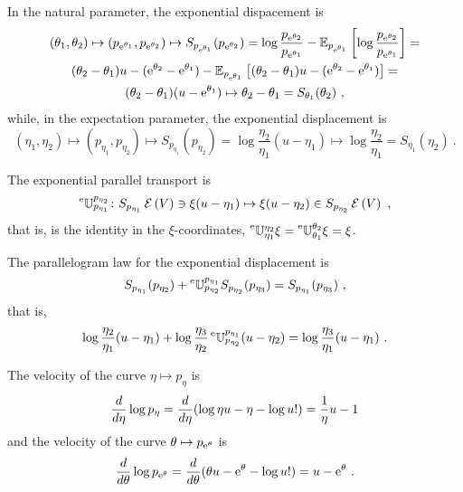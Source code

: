 \documentclass[12pt,a4paper]{amsart}
\begin{document}
In the natural parameter, the exponential dispacement is
\begin{multline}
  \label{eq:6}
  (\theta_1,\theta_2) \mapsto \left(p_{\mathrm{e}^{\theta_1}},p_{\mathrm{e}^{\theta_2}}\right) \mapsto S_{p_{\mathrm{e}^{\theta_1}}}(p_{\mathrm{e}^{\theta_2}}) = \log \frac {p_{\mathrm{e}^{\theta_2}}}{p_{\mathrm{e}^{\theta_1}}} - \operatorname{\mathbb E}_{p_{\mathrm{e}^{\theta_1}}}\left[\log \frac {p_{\mathrm{e}^{\theta_2}}}{p_{\mathrm{e}^{\theta_1}}}\right] = \\ (\theta_2 - \theta_1) u - (\mathrm{e}^{\theta_2} - \mathrm{e}^{\theta_1}) - \operatorname{\mathbb E}_{p_{\mathrm{e}^{\theta_1}}}\left[(\theta_2 - \theta_1) u - (\mathrm{e}^{\theta_2} - \mathrm{e}^{\theta_1})\right] = \\  (\theta_2-\theta_1) (u - \mathrm{e}^{\theta_1}) \mapsto \theta_2 - \theta_1 = S_{\theta_1}(\theta_2) \ ,
\end{multline}
while, in the expectation parameter, the exponential displacement is
\begin{equation}
  \label{eq:9}
  (\eta_1,\eta_2) \mapsto (p_{\eta_1},p_{\eta_2}) \mapsto S_{p_{\eta_1}}(p_{\eta_2}) = \log \frac {\eta_2}{\eta_1} (u - \eta_1) \mapsto \log \frac {\eta_2}{\eta_1} = S_{\eta_1}(\eta_2) \ .
\end{equation}

The exponential parallel transport is
\begin{equation}
  \label{eq:10}
  \prescript{\text{e}}{} {\mathbb U} _ {p_{\eta_1}} ^ {p_{\eta_2}} \colon S_{p_{\eta_1}}\operatorname{\mathcal E}\left(V\right) \ni \xi(u - \eta_1) \mapsto \xi(u - \eta_2) \in S_{p_{\eta_2}}\operatorname{\mathcal E}\left(V\right) \ ,
\end{equation}
that is, is the identity in the $\xi$-coordinates, $\prescript{\text{e}}{} {\mathbb U} _ {\eta_1} ^ {\eta_2} \xi = \prescript{\text{e}}{} {\mathbb U} _ {\theta_1} ^ {\theta_2} \xi = \xi$.

The parallelogram law for the exponential displacement is 
\begin{equation}
  \label{eq:11}
  S_{p_{\eta_1}}(p_{\eta_2}) + \prescript{\text{e}}{} {\mathbb U} _ {p_{\eta_2}} ^ {p_{\eta_1}} S_{p_{\eta_2}}(p_{\eta_3}) = S_{p_{\eta_1}}(p_{\eta_3}) \ ,
\end{equation}
that is,
\begin{equation}
  \label{eq:12}
  \log \frac {\eta_2}{\eta_1}(u - \eta_1) + \log \frac {\eta_3}{\eta_2} \prescript{\text{e}}{} {\mathbb U} _ {p_{\eta_2}} ^ {p_{\eta_1}} (u - \eta_2) = \log \frac {\eta_3}{\eta_1}  (u - \eta_1) \ . 
\end{equation}

The velocity of the curve $\eta \mapsto p_\eta$ is
\begin{equation}
  \label{eq:13}
  \frac{d}{d\eta} \log p_\eta = \frac{d}{d\eta} (\log \eta u - \eta - \log u!) = \frac 1 \eta u - 1  
\end{equation}
and the velocity of the curve $\theta \mapsto p_{\mathrm{e}^\theta}$ is 
\begin{equation}
  \label{eq:14}
  \frac{d}{d\theta} \log p_{\mathrm{e}^\theta} = \frac{d}{d\theta} (\theta u - \mathrm{e}^\theta - \log u!) = u - \mathrm{e}^\theta \ . 
\end{equation}
\end{document}
